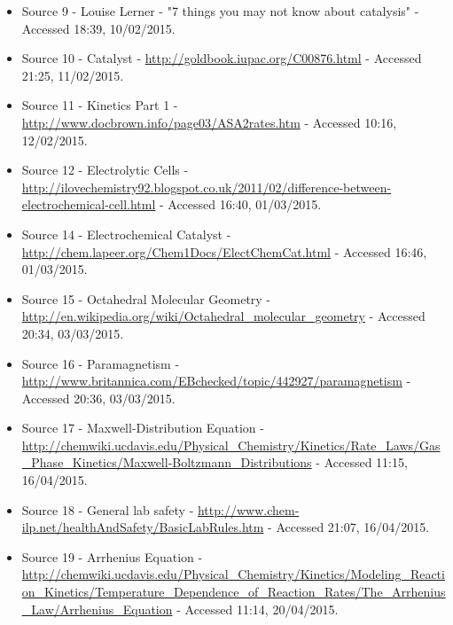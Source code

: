 \begin{itemize}
\item Source 9 - Louise Lerner - "7 things you may not know about catalysis" - Accessed 18:39, 10/02/2015.

\item Source 10 - Catalyst - \url{http://goldbook.iupac.org/C00876.html} - Accessed 21:25, 11/02/2015.

\item Source 11 - Kinetics Part 1 - \url{http://www.docbrown.info/page03/ASA2rates.htm} - Accessed 10:16, 12/02/2015.

\item Source 12 - Electrolytic Cells - \url{http://ilovechemistry92.blogspot.co.uk/2011/02/difference-between-electrochemical-cell.html} - Accessed 16:40, 01/03/2015.

\item Source 14 - Electrochemical Catalyst - \url{http://chem.lapeer.org/Chem1Docs/ElectChemCat.html} - Accessed 16:46, 01/03/2015.

\item Source 15 - Octahedral Molecular Geometry - \url{http://en.wikipedia.org/wiki/Octahedral_molecular_geometry} - Accessed 20:34, 03/03/2015.

\item Source 16 - Paramagnetism - \url{http://www.britannica.com/EBchecked/topic/442927/paramagnetism} - Accessed 20:36, 03/03/2015.

\item Source 17 - Maxwell-Distribution Equation - \url{http://chemwiki.ucdavis.edu/Physical_Chemistry/Kinetics/Rate_Laws/Gas_Phase_Kinetics/Maxwell-Boltzmann_Distributions} - Accessed 11:15, 16/04/2015.

\item Source 18 - General lab safety - \url{http://www.chem-ilp.net/healthAndSafety/BasicLabRules.htm} - Accessed 21:07, 16/04/2015.

\item Source 19 - Arrhenius Equation - \url{http://chemwiki.ucdavis.edu/Physical_Chemistry/Kinetics/Modeling_Reaction_Kinetics/Temperature_Dependence_of_Reaction_Rates/The_Arrhenius_Law/Arrhenius_Equation} - Accessed 11:14, 20/04/2015.





\end{itemize}





